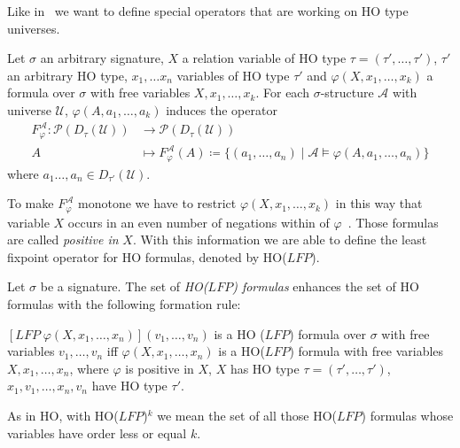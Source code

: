 Like in~\cite{freireMartins2011descriptive} we want to define special operators that are working on HO type
universes.

\begin{definition}
    Let $\sigma$ an arbitrary signature, $X$ a relation variable of HO type $\tau = (\tau', \dots, \tau')$,
    $\tau'$ an arbitrary HO type, $x_1, \dots x_n$ variables of HO type $\tau'$ and $\varphi(X, x_1, \dots, x_k)$ a
    formula over $\sigma$ with free variables $X, x_1, \dots, x_k$. For each $\sigma$-structure $\mathcal{A}$ with
    universe $\mathcal{U}$, $\varphi(A, a_1, \dots, a_k)$ induces the operator
    \begin{align*}
        F_\varphi^\mathcal{A}\colon\mathscr{P}(D_\tau(\mathcal{U})) &\longrightarrow \mathscr{P}(D_\tau(\mathcal{U}))\\
        A &\longmapsto F_\varphi^\mathcal{A}(A) \coloneqq \{(a_1, \dots, a_n) \mid \mathcal{A} \models \varphi(A, a_1,
        \dots, a_n)\}
    \end{align*}
    where $a_1 \dots, a_n \in D_{\tau'}(\mathcal{U})$.
\end{definition}

To make $F_\varphi^\mathcal{A}$ monotone we have to restrict $\varphi(X, x_1, \dots, x_k)$ in this way that variable
$X$ occurs in an even number of negations within of $\varphi$~\cite{freireMartins2011descriptive}. Those formulas
are called \textit{positive in} $X$. With this information we are able to define the least fixpoint operator for HO
formulas, denoted by HO($\mathit{LFP}$).

\begin{definition}
    Let $\sigma$ be a signature. The set of \emph{HO($\mathit{LFP}$) formulas} enhances the set of HO formulas with the
    following formation rule:
    \begin{compactitem}
        \item $[\mathit{LFP}\;\varphi(X, x_1, \dots, x_n)](v_1, \dots, v_n)$ is a HO
        ($\mathit{LFP}$) formula over $\sigma$ with free variables $v_1, \dots, v_n$ iff $\varphi(X, x_1, \dots, x_n)
        $ is a HO($\mathit{LFP}$) formula with free variables $X, x_1, \dots, x_n$, where $\varphi$ is positive in
        $X$, $X$ has HO type $\tau = (\tau', \dots, \tau')$, $x_1, v_1, \dots, x_n, v_n$ have HO type $\tau'$.
    \end{compactitem}
\end{definition}

As in HO, with HO($\mathit{LFP}$)$^k$ we mean the set of all those HO($\mathit{LFP}$) formulas whose variables have
order less or equal $k$.

